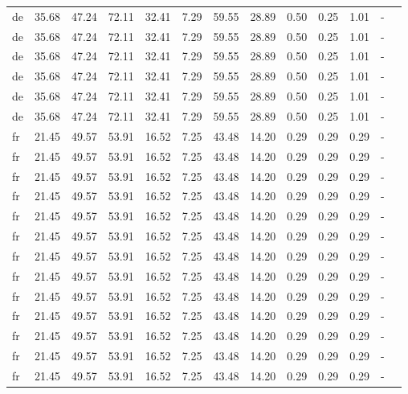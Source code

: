 \begin{table}[H]
\begin{tabularx}{\textwidth}{Xcccccccccccc}
            de & 35.68 & 47.24 & 72.11 & 32.41 & 7.29 & 59.55 & 28.89 & 0.50 & 0.25 & 1.01 & - \\
            de & 35.68 & 47.24 & 72.11 & 32.41 & 7.29 & 59.55 & 28.89 & 0.50 & 0.25 & 1.01 & - \\
            de & 35.68 & 47.24 & 72.11 & 32.41 & 7.29 & 59.55 & 28.89 & 0.50 & 0.25 & 1.01 & - \\
            de & 35.68 & 47.24 & 72.11 & 32.41 & 7.29 & 59.55 & 28.89 & 0.50 & 0.25 & 1.01 & - \\
            de & 35.68 & 47.24 & 72.11 & 32.41 & 7.29 & 59.55 & 28.89 & 0.50 & 0.25 & 1.01 & - \\
            de & 35.68 & 47.24 & 72.11 & 32.41 & 7.29 & 59.55 & 28.89 & 0.50 & 0.25 & 1.01 & - \\
            fr & 21.45 & 49.57 & 53.91 & 16.52 & 7.25 & 43.48 & 14.20 & 0.29 & 0.29 & 0.29 & - \\
            fr & 21.45 & 49.57 & 53.91 & 16.52 & 7.25 & 43.48 & 14.20 & 0.29 & 0.29 & 0.29 & - \\
            fr & 21.45 & 49.57 & 53.91 & 16.52 & 7.25 & 43.48 & 14.20 & 0.29 & 0.29 & 0.29 & - \\
            fr & 21.45 & 49.57 & 53.91 & 16.52 & 7.25 & 43.48 & 14.20 & 0.29 & 0.29 & 0.29 & - \\
            fr & 21.45 & 49.57 & 53.91 & 16.52 & 7.25 & 43.48 & 14.20 & 0.29 & 0.29 & 0.29 & - \\
            fr & 21.45 & 49.57 & 53.91 & 16.52 & 7.25 & 43.48 & 14.20 & 0.29 & 0.29 & 0.29 & - \\
            fr & 21.45 & 49.57 & 53.91 & 16.52 & 7.25 & 43.48 & 14.20 & 0.29 & 0.29 & 0.29 & - \\
            fr & 21.45 & 49.57 & 53.91 & 16.52 & 7.25 & 43.48 & 14.20 & 0.29 & 0.29 & 0.29 & - \\
            fr & 21.45 & 49.57 & 53.91 & 16.52 & 7.25 & 43.48 & 14.20 & 0.29 & 0.29 & 0.29 & - \\
            fr & 21.45 & 49.57 & 53.91 & 16.52 & 7.25 & 43.48 & 14.20 & 0.29 & 0.29 & 0.29 & - \\
            fr & 21.45 & 49.57 & 53.91 & 16.52 & 7.25 & 43.48 & 14.20 & 0.29 & 0.29 & 0.29 & - \\
            fr & 21.45 & 49.57 & 53.91 & 16.52 & 7.25 & 43.48 & 14.20 & 0.29 & 0.29 & 0.29 & - \\
            fr & 21.45 & 49.57 & 53.91 & 16.52 & 7.25 & 43.48 & 14.20 & 0.29 & 0.29 & 0.29 & - \\

\end{tabularx}
\end{table}
